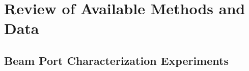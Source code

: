 \cleardoublepage

\chapter{Review of Available Methods and Data}


\section{Beam Port Characterization Experiments}





